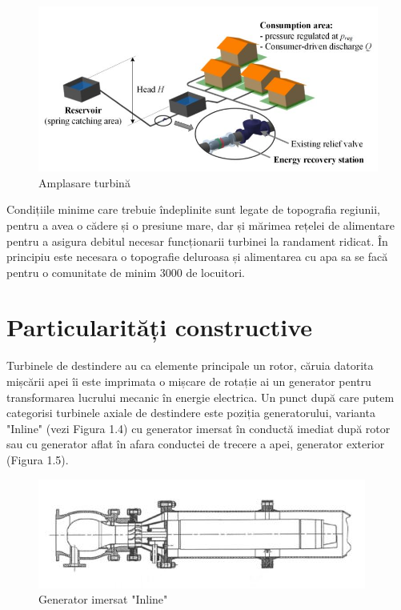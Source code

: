 \begin{figure}[h!]
	\centering
	\includegraphics[scale=0.5]{figures/amplasare_turbina.jpg}
	\caption{Amplasare turbină \protect\cite{andolfatto2016simulation}}
	\label{Amplasare turbin\u{a}}
\end{figure}

Condițiile minime care trebuie îndeplinite sunt legate de topografia regiunii, pentru a avea o cădere și o presiune mare, dar și mărimea rețelei de alimentare pentru a asigura debitul necesar funcționarii turbinei la randament ridicat. În principiu este necesara o topografie deluroasa și alimentarea cu apa sa se facă pentru o comunitate de minim 3000 de locuitori.


\section{Particularități constructive}

Turbinele de destindere au ca elemente principale un rotor, căruia datorita mișcării apei îi este imprimata o mișcare de rotație ai un generator pentru transformarea lucrului mecanic în energie electrica. Un punct după care putem categorisi turbinele axiale de destindere este poziția generatorului, varianta "Inline" (vezi Figura 1.4) cu generator imersat în conductă imediat după rotor sau cu generator aflat în afara conductei de trecere a apei, generator exterior (Figura 1.5).

\begin{figure}[h!]
	\centering
	\includegraphics[scale=1]{figures/generator_inline.jpg}
	\caption{Generator imersat "Inline" \protect\cite{GREES_2014}}
	\label{Generator imersat Inline}
\end{figure}

